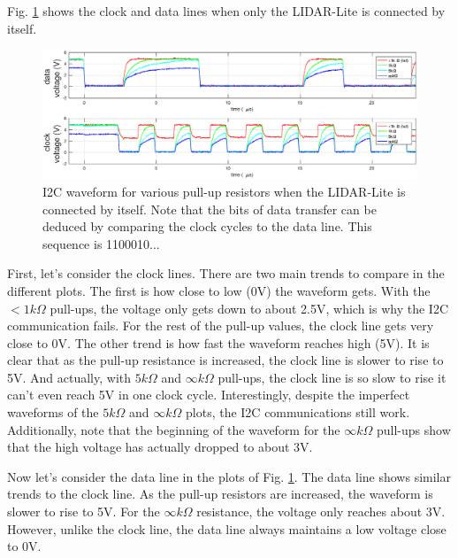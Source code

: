 \documentclass[10pt]{article}
\begin{document}
Fig. \ref{fig:LL} shows the clock and data lines when only the LIDAR-Lite is connected by itself.
\begin{figure}[ht]
\newcommand{\wdt}{.24\textwidth}
\centering

\includegraphics[width=1.0\textwidth]{2pt5microsec/LL_cropped.eps}
\caption{I2C waveform for various pull-up resistors when the LIDAR-Lite is connected by itself. Note that the bits of data transfer can be deduced by comparing the clock cycles to the data line. This sequence is 1100010...}
\label{fig:LL}
\end{figure}
First, let's consider the clock lines. There are two main trends to compare in the different plots. The first is how close to low (0V) the waveform gets. With the $<1k\Omega$ pull-ups, the voltage only gets down to about 2.5V, which is why the I2C communication fails. For the rest of the pull-up values, the clock line gets very close to 0V. The other trend is how fast the waveform reaches high (5V). It is clear that as the pull-up resistance is increased, the clock line is slower to rise to 5V. And actually, with $5 k \Omega$ and $\infty k \Omega$ pull-ups, the clock line is so slow to rise it can't even reach 5V in one clock cycle.  Interestingly, despite the imperfect waveforms of the $5 k \Omega$ and $\infty k \Omega$ plots, the I2C communications still work. Additionally, note that the beginning of the waveform for the $\infty k \Omega$ pull-ups show that the high voltage has actually dropped to about 3V.

Now let's consider the data line in the plots of Fig. \ref{fig:LL}. The data line shows similar trends to the clock line. As the pull-up resistors are increased, the waveform is slower to rise to 5V. For the $\infty k \Omega$ resistance, the voltage only reaches about 3V. However, unlike the clock line, the data line always maintains a low voltage close to 0V.
\end{document}
